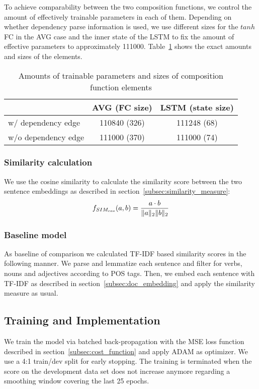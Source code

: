 To achieve comparability between the two composition functions, we control the amount of effectively trainable parameters in each of them. Depending on whether dependency parse information is used, we use different sizes for the $tanh$ \ac{FC} in the \ac{AVG} case and the inner state of the \ac{LSTM} to fix the amount of effective parameters to approximately 111000. Table~\ref{tab:sizes} shows the exact amounts and sizes of the elements. %

\begin{table}[!htb]
  \centering
  \begin{tabular}{ l | c | c }
      & AVG (FC size) & LSTM (state size) \\ \hline
    w/ dependency edge & 110840 (326) & 111248 (68) \\ 
    w/o dependency edge & 111000 (370) & 111000 (74) \\
  \end{tabular}
  \caption{Amounts of trainable parameters and sizes of composition function elements}
  \label{tab:sizes}
\end{table}

\subsubsection{Similarity calculation}
We use the cosine similarity to calculate the similarity score between the two sentence embeddings as described in section~\ref{subsec:similarity_measure}:
\begin{equation}
f_{SIM_{cos}}(a,b) = \frac{a \cdot b}{\lVert a\rVert_2\lVert b\rVert_2} 
\end{equation}

\subsubsection{Baseline model}
As baseline of comparison we calculated TF-IDF based similarity scores in the following manner. We parse and lemmatize each sentence and filter for verbs, nouns and adjectives according to POS tags. Then, we embed each sentence with TF-IDF as described in section~\ref{subsec:doc_embedding} and apply the similarity measure as usual. 

\subsection{Training and Implementation}
We train the model via batched back-propagation with the \ac{MSE} loss function described in section~\ref{subsec:cost_function} and apply ADAM \autocite{kingma_adam:_2014} %
as optimizer. We use a 4:1 train/dev split for early stopping. The training is terminated when the score on the development data set does not increase anymore regarding a smoothing window covering the last 25 epochs. 

